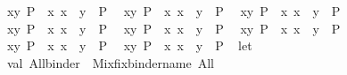 \begin{isabellebody}
\ \ {\isachardoublequoteopen}{\isasymforall}x{\isasymle}y{\isachardot}{\kern0pt}\ P{\isachardoublequoteclose}\ {\isasymrightharpoonup}\ {\isachardoublequoteopen}{\isasymforall}x{\isachardot}{\kern0pt}\ x\ {\isasymle}\ y\ {\isasymlongrightarrow}\ P{\isachardoublequoteclose}\isanewline
\ \ {\isachardoublequoteopen}{\isasymexists}x{\isasymle}y{\isachardot}{\kern0pt}\ P{\isachardoublequoteclose}\ {\isasymrightharpoonup}\ {\isachardoublequoteopen}{\isasymexists}x{\isachardot}{\kern0pt}\ x\ {\isasymle}\ y\ {\isasymand}\ P{\isachardoublequoteclose}\isanewline
\ \ {\isachardoublequoteopen}{\isasymforall}x{\isachargreater}{\kern0pt}y{\isachardot}{\kern0pt}\ P{\isachardoublequoteclose}\ {\isasymrightharpoonup}\ {\isachardoublequoteopen}{\isasymforall}x{\isachardot}{\kern0pt}\ x\ {\isachargreater}{\kern0pt}\ y\ {\isasymlongrightarrow}\ P{\isachardoublequoteclose}\isanewline
\ \ {\isachardoublequoteopen}{\isasymexists}x{\isachargreater}{\kern0pt}y{\isachardot}{\kern0pt}\ P{\isachardoublequoteclose}\ {\isasymrightharpoonup}\ {\isachardoublequoteopen}{\isasymexists}x{\isachardot}{\kern0pt}\ x\ {\isachargreater}{\kern0pt}\ y\ {\isasymand}\ P{\isachardoublequoteclose}\isanewline
\ \ {\isachardoublequoteopen}{\isasymforall}x{\isasymge}y{\isachardot}{\kern0pt}\ P{\isachardoublequoteclose}\ {\isasymrightharpoonup}\ {\isachardoublequoteopen}{\isasymforall}x{\isachardot}{\kern0pt}\ x\ {\isasymge}\ y\ {\isasymlongrightarrow}\ P{\isachardoublequoteclose}\isanewline
\ \ {\isachardoublequoteopen}{\isasymexists}x{\isasymge}y{\isachardot}{\kern0pt}\ P{\isachardoublequoteclose}\ {\isasymrightharpoonup}\ {\isachardoublequoteopen}{\isasymexists}x{\isachardot}{\kern0pt}\ x\ {\isasymge}\ y\ {\isasymand}\ P{\isachardoublequoteclose}\isanewline
\ \ {\isachardoublequoteopen}{\isasymforall}x{\isasymnoteq}y{\isachardot}{\kern0pt}\ P{\isachardoublequoteclose}\ {\isasymrightharpoonup}\ {\isachardoublequoteopen}{\isasymforall}x{\isachardot}{\kern0pt}\ x\ {\isasymnoteq}\ y\ {\isasymlongrightarrow}\ P{\isachardoublequoteclose}\isanewline
\ \ {\isachardoublequoteopen}{\isasymexists}x{\isasymnoteq}y{\isachardot}{\kern0pt}\ P{\isachardoublequoteclose}\ {\isasymrightharpoonup}\ {\isachardoublequoteopen}{\isasymexists}x{\isachardot}{\kern0pt}\ x\ {\isasymnoteq}\ y\ {\isasymand}\ P{\isachardoublequoteclose}\isanewline
%
\isadelimML
\isanewline
%
\endisadelimML
%
\isatagML
{}\isamarkupfalse%
\ {\isacartoucheopen}\isanewline
let\isanewline
\ \ val\ All{\isacharunderscore}{\kern0pt}binder\ {\isacharequal}{\kern0pt}\ Mixfix{\isachardot}{\kern0pt}binder{\isacharunderscore}{\kern0pt}name\ \isactrlconstUNDERSCOREsyntax {\isasymopen}All{\isasymclose}{\isacharsemicolon}{\kern0pt}\isanewline

\end{isabellebody}
